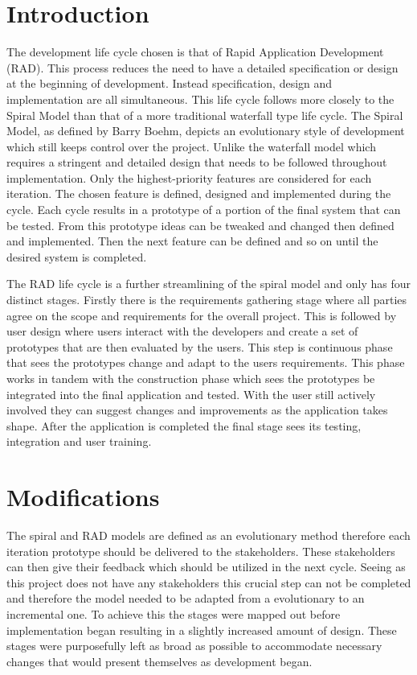 \section{Introduction}
The development life cycle chosen is that of Rapid Application Development (RAD). This process reduces the need to have a detailed specification or design at the beginning of development. Instead specification, design and implementation are all simultaneous. This life cycle follows more closely to the Spiral Model than that of a more traditional waterfall type life cycle. The Spiral Model, as defined by Barry Boehm\cite{spiral_model}, depicts an evolutionary style of development which still keeps control over the project. Unlike the waterfall model which requires a stringent and detailed design that needs to be followed throughout implementation. Only the highest-priority features are considered for each iteration. The chosen feature is defined, designed and implemented during the cycle. Each cycle results in a prototype of a portion of the final system that can be tested. From this prototype ideas can be tweaked and changed then defined and implemented. Then the next feature can be defined and so on until the desired system is completed.

The RAD life cycle is a further streamlining of the spiral model and only has four distinct stages. Firstly there is the requirements gathering stage where all parties agree on the scope and requirements for the overall project. This is followed by user design where users interact with the developers and create a set of prototypes that are then evaluated by the users. This step is continuous phase that sees the prototypes change and adapt to the users requirements. This phase works in tandem with the construction phase which sees the prototypes be integrated into the final application and tested. With the user still actively involved they can suggest changes and improvements as the application takes shape. After the application is completed the final stage sees its testing, integration and user training.


\section{Modifications}
The spiral and RAD models are defined as an evolutionary method therefore each iteration prototype should be delivered to the stakeholders. These stakeholders can then give their feedback which should be utilized in the next cycle. Seeing as this project does not have any stakeholders this crucial step can not be completed and therefore the model needed to be adapted from a evolutionary to an incremental one. To achieve this the stages were mapped out before implementation began resulting in a slightly increased amount of design. These stages were purposefully left as broad as possible to accommodate necessary changes that would present themselves as development began.

